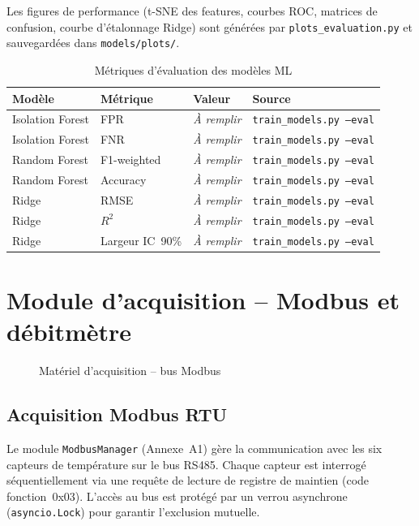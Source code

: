 Les figures de performance (t-SNE des features, courbes ROC, matrices de confusion, courbe d'étalonnage Ridge) sont générées par \texttt{plots\_evaluation.py} et sauvegardées dans \texttt{models/plots/}.

\begin{table}[htbp]
\centering
\caption{Métriques d'évaluation des modèles ML}
\label{tab:metriques}
\begin{tabular}{p{}p{}p{}p{}}
\toprule
\textbf{Modèle} & \textbf{Métrique} & \textbf{Valeur} & \textbf{Source} \\
\midrule
Isolation Forest & FPR & \textit{À remplir} & \texttt{train\_models.py --eval} \\
Isolation Forest & FNR & \textit{À remplir} & \texttt{train\_models.py --eval} \\
Random Forest & F1-weighted & \textit{À remplir} & \texttt{train\_models.py --eval} \\
Random Forest & Accuracy & \textit{À remplir} & \texttt{train\_models.py --eval} \\
Ridge & RMSE & \textit{À remplir} & \texttt{train\_models.py --eval} \\
Ridge & \(R^2\) & \textit{À remplir} & \texttt{train\_models.py --eval} \\
Ridge & Largeur IC~90\% & \textit{À remplir} & \texttt{train\_models.py --eval} \\
\bottomrule
\end{tabular}
\end{table}

\section{Module d'acquisition -- Modbus et débitmètre}

\begin{figure}[htbp]
  \centering
  \caption{Matériel d'acquisition -- bus Modbus}
  \label{fig:modbus_hardware}
\end{figure}

\subsection{Acquisition Modbus RTU}

Le module \texttt{ModbusManager} (Annexe~A1) gère la communication avec les six capteurs de température sur le bus RS485. Chaque capteur est interrogé séquentiellement via une requête de lecture de registre de maintien (code fonction~0x03). L'accès au bus est protégé par un verrou asynchrone (\texttt{asyncio.Lock}) pour garantir l'exclusion mutuelle.

